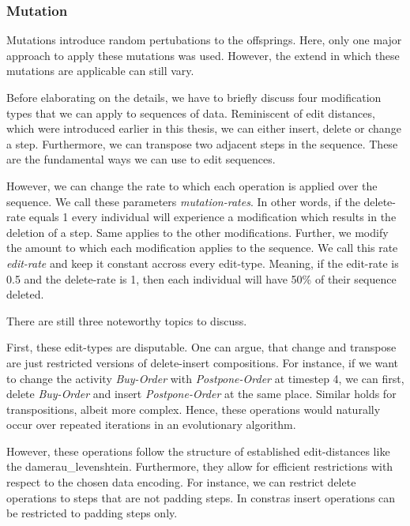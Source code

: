 \documentclass[./../../paper.tex]{subfiles}
\begin{document}

\subsubsection{Mutation}
Mutations introduce random pertubations to the offsprings. Here, only one major approach to apply these mutations was used. However, the extend in which these mutations are applicable can still vary.

Before elaborating on the details, we have to briefly discuss four modification types that we can apply to sequences of data. Reminiscent of edit distances, which were introduced earlier in this thesis, we can either insert, delete or change a step. Furthermore, we can transpose two adjacent steps in the sequence. These are the fundamental ways we can use to edit sequences.

However, we can change the rate to which each operation is applied over the sequence. We call these parameters \emph{mutation-rates}. In other words, if the delete-rate equals 1 every individual will experience a modification which results in the deletion of a step. Same applies to the other modifications. Further, we modify the amount to which each modification applies to the sequence. We call this rate \emph{edit-rate} and keep it constant accross every edit-type. Meaning, if the edit-rate is 0.5 and the delete-rate is 1, then each individual will have 50\% of their sequence deleted.

There are still three noteworthy topics to discuss.

First, these edit-types are disputable. One can argue, that change and transpose are just restricted versions of delete-insert compositions. For instance, if we want to change the activity \emph{Buy-Order} with \emph{Postpone-Order} at timestep 4, we can first, delete \emph{Buy-Order} and insert \emph{Postpone-Order} at the same place. Similar holds for transpositions, albeit more complex. Hence, these operations would naturally occur over repeated iterations in an evolutionary algorithm.

However, these operations follow the structure of established edit-distances like the \gls{damerau_levenshtein}. Furthermore, they allow for efficient restrictions with respect to the chosen data encoding. For instance, we can restrict delete operations to steps that are not padding steps. In constras insert operations can be restricted to padding steps only.
\end{document}
